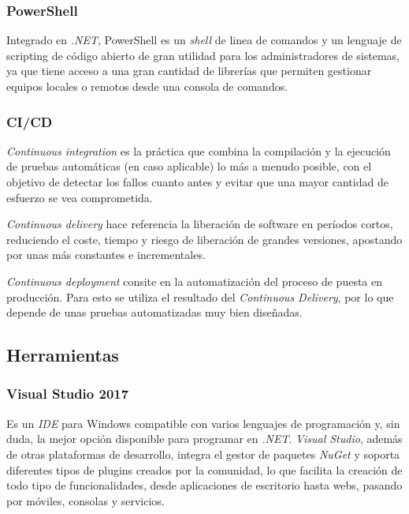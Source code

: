         \subsubsection{PowerShell}
            Integrado en \textit{.NET}, PowerShell es un \textit{shell} de linea de comandos y un lenguaje de scripting de código abierto de gran utilidad para los administradores de sistemas, ya que tiene acceso a una gran cantidad de librerías que permiten gestionar equipos locales o remotos desde una consola de comandos. \cite{powershell}
        
        \subsubsection{CI/CD}
            \textit{Continuous integration} es la práctica que combina la compilación y la ejecución de pruebas automáticas (en caso aplicable) lo más a menudo posible, con el objetivo de detectar los fallos cuanto antes y evitar que una mayor cantidad de esfuerzo se vea comprometida.
            
            \textit{Continuous delivery} hace referencia la liberación de software en períodos cortos, reduciendo el coste, tiempo y riesgo de liberación de grandes versiones, apostando por unas más constantes e incrementales.
            
            \textit{Continuous deployment} consite en la automatización del proceso de puesta en producción. Para esto se utiliza el resultado del \textit{Continuous Delivery}, por lo que depende de unas pruebas automatizadas muy bien diseñadas. \cite{ci} \cite{cd} \cite{cicd}

    \subsection{Herramientas} 
        \subsubsection{Visual Studio 2017}
            Es un \textit{IDE} para Windows compatible con varios lenguajes de programación y, sin duda, la mejor opción disponible para programar en \textit{.NET}. \textit{Visual Studio}, además de otras plataformas de desarrollo, integra el gestor de paquetes \textit{NuGet} y soporta diferentes tipos de plugins creados por la comunidad, lo que facilita la creación de todo tipo de funcionalidades, desde aplicaciones de escritorio hasta webs, pasando por móviles, consolas y servicios. \cite{visualstudio} \cite{wikivisualstudio}

